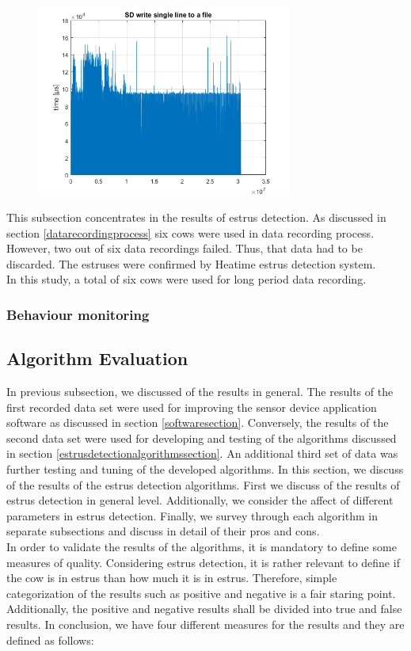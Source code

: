 \documentclass[english,12pt,a4paper,pdftex,elec,utf8]{aaltothesis}
\begin{document}
\begin{figure}[htb]
\centering
\includegraphics[width = 0.75\textwidth]{figures/writetimes_vanharauta.png}
\caption{} \label{}
\end{figure}


This subsection concentrates in the results of estrus detection. As discussed in section \ref{datarecordingprocess} six cows were used in data recording process. However, two out of six data recordings failed. Thus, that data had to be discarded. The estruses were confirmed by Heatime estrus detection system. \\
In this study, a total of six cows were used for long period data recording.

\subsubsection{Behaviour monitoring}

\subsection{Algorithm Evaluation} \label{algorithmevaluationsection}

In previous subsection, we discussed of the results in general. The results of the first recorded data set were used for improving the sensor device application software as discussed in section \ref{softwaresection}. Conversely, the results of the second data set were used for developing and testing of the algorithms discussed in section \ref{estrusdetectionalgorithmssection}. An additional third set of data was further testing and tuning of the developed algorithms. In this section, we discuss of the results of the estrus detection algorithms. First we discuss of the results of estrus detection in general level. Additionally, we consider the affect of different parameters in estrus detection. Finally, we survey through each algorithm in separate subsections and discuss in detail of their pros and cons. \\
In order to validate the results of the algorithms, it is mandatory to define some measures of quality. Considering estrus detection, it is rather relevant to define if the cow is in estrus than how much it is in estrus. Therefore, simple categorization of the results such as positive and negative is a fair staring point. Additionally, the positive and negative results shall be divided into true and false results. In conclusion, we have four different measures for the results and they are defined as follows:
\end{document}
